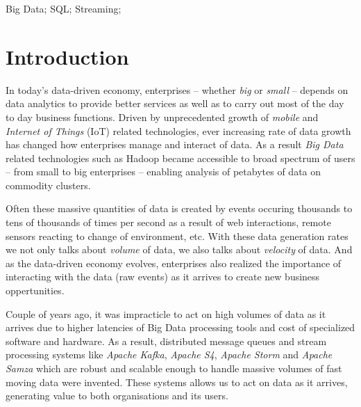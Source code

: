 \documentclass[10pt, conference, compsocconf]{IEEEtran}
\begin{document}
\begin{IEEEkeywords}
Big Data; SQL; Streaming;

\end{IEEEkeywords}


%
\IEEEpeerreviewmaketitle



\section{Introduction}
In today’s data-driven economy, enterprises – whether \textit{big} or \textit{small} – depends on data analytics to provide better services as well as to carry out most of the day to day business functions. Driven by unprecedented growth of \textit{mobile} and \textit{Internet of Things} (IoT) related technologies, ever increasing rate of data growth has changed how enterprises manage and interact of data. As a result \textit{Big Data} related technologies such as Hadoop became accessible to broad spectrum of users -- from small to big enterprises -- enabling analysis of petabytes of data on commodity clusters.

Often these massive quantities of data is created by events occuring thousands to tens of thousands of times per second as a result of web interactions, remote sensors reacting to change of environment, etc. With these data generation rates we not only talks about \textit{volume} of data, we also talks about \textit{velocity} of data. And as the data-driven economy evolves, enterprises also realized the importance of interacting with the data (raw events) as it arrives to create new business oppertunities. 

Couple of years ago, it was impracticle to act on high volumes of data as it arrives due to higher latencies of Big Data processing tools and cost of specialized software and hardware. As a result, distributed message queues and stream processing systems like \textit{Apache Kafka}, \textit{Apache S4}, \textit{Apache Storm} and \textit{Apache Samza} which are robust and scalable enough to handle massive volumes of fast moving data were invented. These systems allows us to act on data as it arrives, generating value to both organisations and its users.
\end{document}
